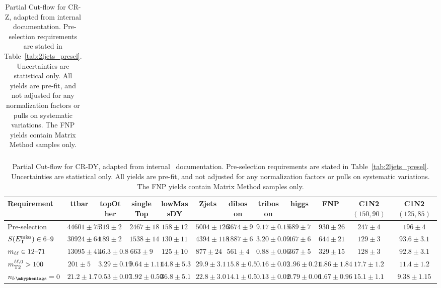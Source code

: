 \begin{sidewaystable}[tp]
\begin{center}
\begin{adjustbox}{width=\textwidth}
\begin{tabular}{lccccccccccccc}
\end{tabular}
\end{adjustbox}
\end{center}
\caption[
Partial Cut-flow for CR-Z
]{%
Partial Cut-flow for CR-Z,
adapted from internal \atlas\ documentation.
Pre-selection requirements are stated in Table~\ref{tab:2ljets_presel}.
Uncertainties are statistical only.
All yields are pre-fit, and not adjusted for any normalization factors or pulls
on systematic variations.
The FNP yields contain Matrix Method samples only.
}
\label{tab:cutflows_CR-Z}
\end{sidewaystable}

\begin{sidewaystable}[tp]
\begin{center}
\begin{adjustbox}{width=\textwidth}
\begin{tabular}{lccccccccccc}
Requirement & ttbar & topOther & singleTop & lowMassDY & Zjets & diboson & triboson & higgs & FNP & C1N2 $(150, 90)$ & C1N2 $(125, 85)$ \\
\hline
Pre-selection & $44601 \pm 75$ & $319 \pm 2$ & $2467 \pm 18$ & $158 \pm 12$ & $5004 \pm 126$ & $3674 \pm 9$ & $9.17 \pm 0.15$ & $689 \pm 7$ & $930 \pm 26$ & $247 \pm 4$ & $196 \pm 4$ \\
$S(E_\mathrm{T}^\mathrm{miss}) \in 6\textrm{--}9$ & $30924 \pm 64$ & $189 \pm 2$ & $1538 \pm 14$ & $130 \pm 11$ & $4394 \pm 118$ & $1887 \pm 6$ & $3.20 \pm 0.09$ & $467 \pm 6$ & $644 \pm 21$ & $129 \pm 3$ & $93.6 \pm 3.1$ \\
$m_{\ell\ell} \in 12\textrm{--}71$ & $13095 \pm 41$ & $46.3 \pm 0.8$ & $663 \pm 9$ & $125 \pm 10$ & $877 \pm 24$ & $561 \pm 4$ & $0.88 \pm 0.06$ & $367 \pm 5$ & $329 \pm 15$ & $128 \pm 3$ & $92.8 \pm 3.1$ \\
$m_\mathrm{T2}^{\ell\ell,0} > 100$ & $201 \pm 5$ & $3.29 \pm 0.19$ & $9.64 \pm 1.11$ & $44.8 \pm 5.3$ & $29.9 \pm 3.1$ & $15.8 \pm 0.5$ & $0.16 \pm 0.02$ & $1.96 \pm 0.21$ & $4.86 \pm 1.84$ & $17.7 \pm 1.2$ & $11.4 \pm 1.2$ \\
$\nbtag = 0$ & $21.2 \pm 1.7$ & $0.53 \pm 0.07$ & $1.92 \pm 0.50$ & $36.8 \pm 5.1$ & $22.8 \pm 3.0$ & $14.1 \pm 0.5$ & $0.13 \pm 0.02$ & $0.79 \pm 0.06$ & $1.67 \pm 0.96$ & $15.1 \pm 1.1$ & $9.38 \pm 1.15$ \\
\end{tabular}
\end{adjustbox}
\end{center}
\caption[
Partial Cut-flow for CR-DY
]{%
Partial Cut-flow for CR-DY,
adapted from internal \atlas\ documentation.
Pre-selection requirements are stated in Table~\ref{tab:2ljets_presel}.
Uncertainties are statistical only.
All yields are pre-fit, and not adjusted for any normalization factors or pulls
on systematic variations.
The FNP yields contain Matrix Method samples only.
}
\label{tab:cutflows_CR-DY}
\end{sidewaystable}

